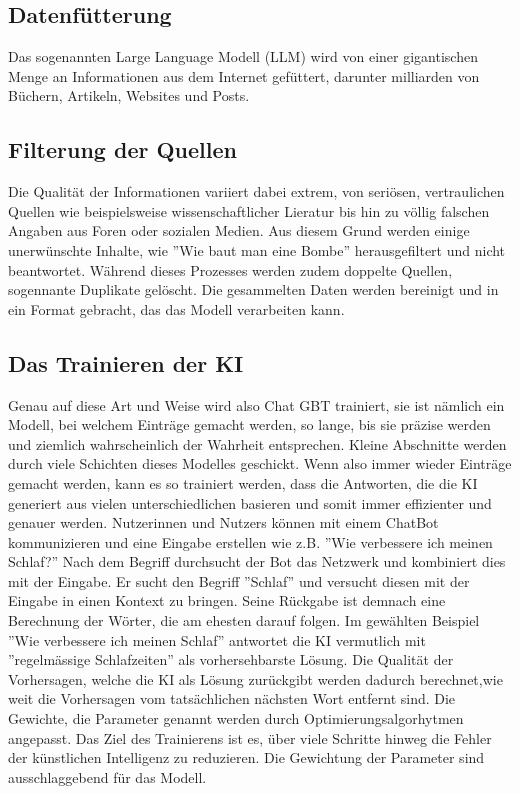\documentclass{report}
\begin{document}
\subsection{Datenfütterung}
Das sogenannten Large Language Modell (LLM) wird von einer gigantischen Menge an Informationen aus dem Internet gefüttert, darunter milliarden von Büchern, Artikeln, Websites und Posts.
\subsection{Filterung der Quellen} 
Die Qualität der Informationen variiert dabei extrem, von seriösen, vertraulichen Quellen wie beispielsweise wissenschaftlicher Lieratur bis hin zu völlig falschen Angaben aus Foren oder sozialen Medien. Aus diesem Grund werden einige unerwünschte Inhalte, wie ''Wie baut man eine Bombe'' herausgefiltert und nicht beantwortet. Während dieses Prozesses werden zudem doppelte Quellen, sogennante Duplikate gelöscht. Die gesammelten Daten werden bereinigt und in ein Format gebracht, das das Modell verarbeiten kann.
\subsection{Das Trainieren der KI} 
Genau auf diese Art und Weise wird also Chat GBT trainiert, sie ist nämlich ein Modell, bei welchem Einträge gemacht werden, so lange, bis sie präzise werden und ziemlich wahrscheinlich der Wahrheit entsprechen. Kleine Abschnitte werden durch viele Schichten dieses Modelles geschickt. Wenn also immer wieder Einträge gemacht werden, kann es so trainiert werden, dass die Antworten, die die KI generiert aus vielen unterschiedlichen basieren und somit immer effizienter und genauer werden. Nutzerinnen und Nutzers können mit einem ChatBot kommunizieren und eine Eingabe erstellen wie z.B. ''Wie verbessere ich meinen Schlaf?'' Nach dem Begriff durchsucht der Bot das Netzwerk und kombiniert dies mit der Eingabe. Er sucht den Begriff ''Schlaf'' und versucht diesen mit der Eingabe in einen Kontext zu bringen. Seine Rückgabe ist demnach eine Berechnung der Wörter, die am ehesten darauf folgen. Im gewählten Beispiel ''Wie verbessere ich meinen Schlaf'' antwortet die KI vermutlich mit ''regelmässige Schlafzeiten'' als vorhersehbarste Lösung. Die Qualität der Vorhersagen, welche die KI als Lösung zurückgibt werden dadurch berechnet,wie weit die Vorhersagen vom tatsächlichen nächsten Wort entfernt sind.
Die Gewichte, die Parameter genannt werden durch Optimierungsalgorhytmen angepasst. Das Ziel des Trainierens ist es, über viele Schritte hinweg die Fehler der künstlichen Intelligenz zu reduzieren. Die Gewichtung der Parameter sind ausschlaggebend für das Modell.
\end{document}
